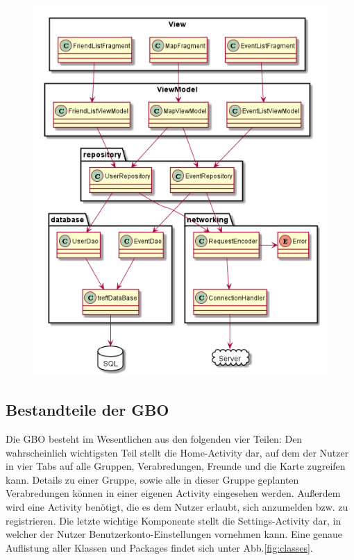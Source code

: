 \documentclass[parskip=full,11pt]{scrartcl}
\begin{document}
\begin{figure}
    \centering
    \includegraphics[width = \columnwidth / 3 * 2]{database.png}
    \label{fig:structure}
\end{figure}


\pagebreak

\subsection{Bestandteile der GBO}

Die GBO besteht im Wesentlichen aus den
folgenden vier Teilen: Den wahrscheinlich wichtigsten Teil stellt die Home-Activity
dar, auf dem der Nutzer in vier Tabs auf alle Gruppen, Verabredungen, Freunde und
die Karte zugreifen kann. Details zu einer Gruppe, sowie alle in dieser Gruppe
geplanten Verabredungen können in einer eigenen Activity eingesehen werden.
Außerdem wird eine Activity benötigt, die es dem Nutzer erlaubt, sich anzumelden
bzw. zu registrieren. Die letzte wichtige Komponente stellt die Settings-Activity
dar, in welcher der Nutzer Benutzerkonto-Einstellungen vornehmen kann. Eine genaue
Auflistung aller Klassen und Packages findet sich unter Abb.\ref{fig:classes}.
\end{document}
